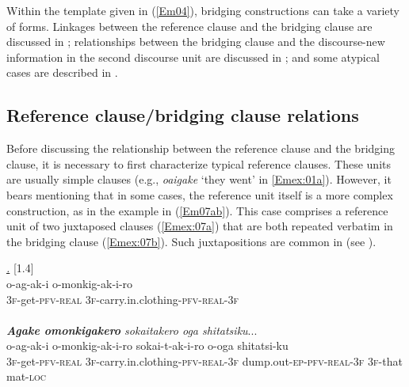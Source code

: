 \documentclass[output=paper]{LSP/langsci}
\begin{document}
%
Within the template given in (\ref{Em04}), bridging constructions can take a variety of forms. Linkages between the reference clause and the bridging clause are discussed in ; relationships between the bridging clause and the discourse-new information in the second discourse unit are discussed in ; and some atypical cases are described in .
%
\subsection{Reference clause/bridging clause relations}
\label{Emrelations}
Before discussing the relationship between the reference clause and the bridging clause, it is necessary to first characterize typical reference clauses. These units are usually simple clauses (e.g., \textit{oaigake} `they went' in \ref{Emex:01a}). However, it bears mentioning that in some cases, the reference unit itself is a more complex construction, as in the example in (\ref{Em07ab}). This case comprises a reference unit of two juxtaposed clauses (\ref{Emex:07a}) that are both repeated verbatim in the bridging clause (\ref{Emex:07b}). Such juxtapositions are common in  (see ).
 
\begin{exe}
\ex \label{Em07ab}
\begin{xlist}
\ex \label{Emex:07a}
\glt \textit{\underline{.}} [1.4]\\
\gll o-ag-ak-i o-monkig-ak-i-ro \\
 \textsc{3f-}get\textsc{-pfv-real} \textsc{3f-}carry.in.clothing\textsc{-pfv-real-3f}\\
\glt {}\\
\ex \label{Emex:07b}
\glt \textit{\textbf{Agake omonkigakero} sokaitakero oga shitatsiku}...\\
\gll o-ag-ak-i o-monkig-ak-i-ro sokai-t-ak-i-ro o-oga shitatsi-ku\\     	      
   \textsc{3f-}get\textsc{-pfv-real} \textsc{3f-}carry.in.clothing\textsc{-pfv-real-3f} dump.out\textsc{-ep-pfv-real-3f} \textsc{3f-}that mat\textsc{-loc}\\
\glt {}
\end{xlist}
\end{exe}
\end{document}

